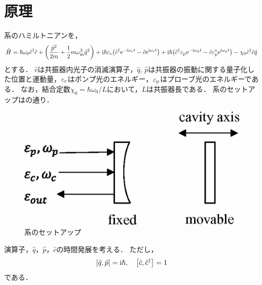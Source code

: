 \documentclass{report}
\begin{document}
    \section{原理}
      系のハミルトニアンを，
      \begin{align}
        \hat{H} = \hbar\omega_0\hat{c}^{\dag}\hat{c} + \qty(\frac{\hat{p}^2}{2m} + \frac{1}{2}m\omega^2_{\mathrm{m}}\hat{q}^2) + \mathrm{i}\hbar\varepsilon_{\mathrm{c}}\qty(\hat{c}^{\dag}\mathrm{e}^{-\mathrm{i}\omega_{\mathrm{c}}t} - \hat{c}\mathrm{e}^{\mathrm{i}\omega_{\mathrm{c}}t}) + \mathrm{i}\hbar\qty(\hat{c}^{\dag}\varepsilon_{\mathrm{p}}\mathrm{e}^{-\mathrm{i}\omega_{\mathrm{p}}t} - \hat{c}\varepsilon^*_{\mathrm{p}}\mathrm{e}^{\mathrm{i}\omega_{\mathrm{p}}t}) - \chi_0\hat{c}^{\dag}\hat{c}\hat{q}
      \end{align}
      とする．
      $\hat{c}$は共振器内光子の消滅演算子，$\hat{q}$, $\hat{p}$は共振器の振動に関する量子化した位置と運動量，$\varepsilon_{\mathrm{c}}$はポンプ光のエネルギー，$\varepsilon_{\mathrm{p}}$はプローブ光のエネルギーである．
      なお，結合定数$\chi_0 = \hbar\omega_0 / L$において，$L$は共振器長である．
      系のセットアップはの通り．
      \begin{figure}[H]
        \centering
        \includegraphics[width = 0.5\linewidth]{./src/Electromagnetically_induced_transparency_in_mechanical_effects_of_light/1.png}
        \caption{系のセットアップ}\label{PhysRevA.81.041803-fig-1}
      \end{figure}
      演算子，$\hat{q}$，$\hat{p}$，$\hat{c}$の時間発展を考える．
      ただし，
      \begin{align}
        \qty[\hat{q}, \hat{p}] = \mathrm{i}\hbar,\quad \qty[\hat{c}, \hat{c}^{\dag}] = 1
      \end{align}
      である．
\end{document}
